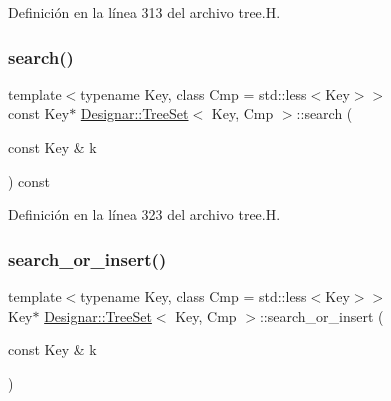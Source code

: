 Definición en la línea 313 del archivo tree.\+H.

\mbox{\label{class_designar_1_1_tree_set_a6b8bce7908110a0ade8ca556191d29be}} 
\subsubsection{\texorpdfstring{search()}{search()}\hspace{0.1cm}{\footnotesize\ttfamily [2/2]}}
{\footnotesize\ttfamily template$<$typename Key, class Cmp = std\+::less$<$\+Key$>$$>$ \\
const Key$\ast$ \hyperlink{class_designar_1_1_tree_set}{Designar\+::\+Tree\+Set}$<$ Key, Cmp $>$\+::search (\begin{DoxyParamCaption}\item[{const Key \&}]{k }\end{DoxyParamCaption}) const\hspace{0.3cm}{\ttfamily [inline]}}



Definición en la línea 323 del archivo tree.\+H.

\mbox{\label{class_designar_1_1_tree_set_a0864bfc148a71b4ea0877d07d4924cd0}} 
\subsubsection{\texorpdfstring{search\+\_\+or\+\_\+insert()}{search\_or\_insert()}\hspace{0.1cm}{\footnotesize\ttfamily [1/2]}}
{\footnotesize\ttfamily template$<$typename Key, class Cmp = std\+::less$<$\+Key$>$$>$ \\
Key$\ast$ \hyperlink{class_designar_1_1_tree_set}{Designar\+::\+Tree\+Set}$<$ Key, Cmp $>$\+::search\+\_\+or\+\_\+insert (\begin{DoxyParamCaption}\item[{const Key \&}]{k }\end{DoxyParamCaption})\hspace{0.3cm}{\ttfamily [inline]}}



